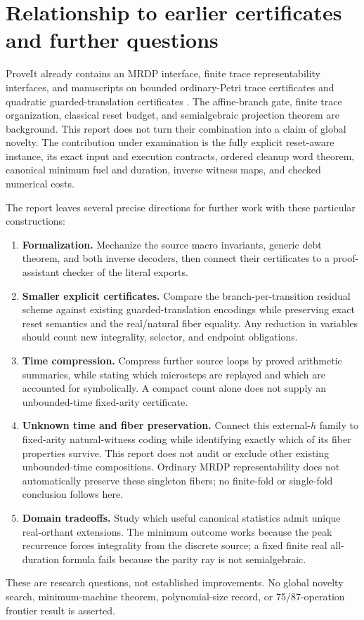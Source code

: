 \documentclass[11pt,letterpaper]{article}
\theoremstyle{definition}
\theoremstyle{remark}
\begin{document}
\section{Relationship to earlier certificates and further questions}
\label{qoc:rn:sec:scope}
ProveIt already contains an MRDP interface, finite trace representability interfaces, and manuscripts on bounded ordinary-Petri trace certificates and quadratic guarded-translation certificates \cite{rn:proveit-mrdp,rn:proveit-trace,rn:proveit-catalogue}. The affine-branch gate, finite trace organization, classical reset budget, and semialgebraic projection theorem are background. This report does not turn their combination into a claim of global novelty. The contribution under examination is the fully explicit reset-aware instance, its exact input and execution contracts, ordered cleanup word theorem, canonical minimum fuel and duration, inverse witness maps, and checked numerical costs.

The report leaves several precise directions for further work with these particular constructions:
\begin{enumerate}
\item \textbf{Formalization.} Mechanize the source macro invariants, generic debt theorem, and both inverse decoders, then connect their certificates to a proof-assistant checker of the literal exports.
\item \textbf{Smaller explicit certificates.} Compare the branch-per-transition residual scheme against existing guarded-translation encodings while preserving exact reset semantics and the real/natural fiber equality. Any reduction in variables should count new integrality, selector, and endpoint obligations.
\item \textbf{Time compression.} Compress further source loops by proved arithmetic summaries, while stating which microsteps are replayed and which are accounted for symbolically. A compact count alone does not supply an unbounded-time fixed-arity certificate.
\item \textbf{Unknown time and fiber preservation.} Connect this external-$h$ family to fixed-arity natural-witness coding while identifying exactly which of its fiber properties survive. This report does not audit or exclude other existing unbounded-time compositions. Ordinary MRDP representability does not automatically preserve these singleton fibers; no finite-fold or single-fold conclusion follows here.
\item \textbf{Domain tradeoffs.} Study which useful canonical statistics admit unique real-orthant extensions. The minimum outcome works because the peak recurrence forces integrality from the discrete source; a fixed finite real all-duration formula fails because the parity ray is not semialgebraic.
\end{enumerate}
These are research questions, not established improvements. No global novelty search, minimum-machine theorem, polynomial-size record, or 75/87-operation frontier result is asserted.
\end{document}
